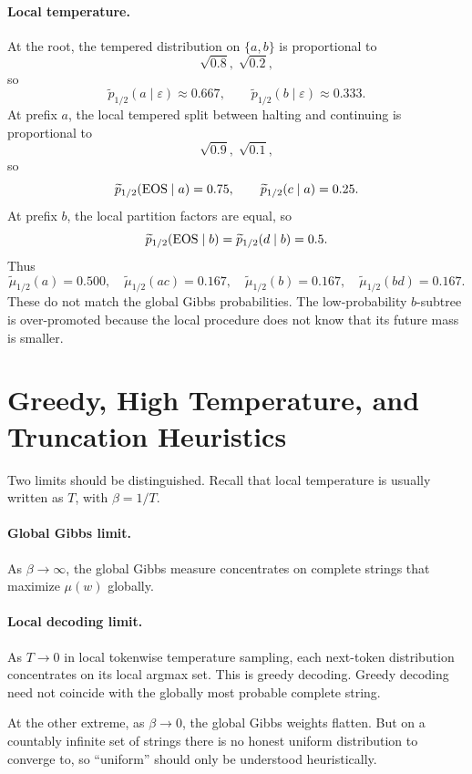 \paragraph{Local temperature.}
At the root, the tempered distribution on $\{a,b\}$ is proportional to
\[
  \sqrt{0.8},\; \sqrt{0.2},
\]
so
\[
  \widetilde p_{1/2}(a \mid \varepsilon) \approx 0.667,
  \qquad
  \widetilde p_{1/2}(b \mid \varepsilon) \approx 0.333.
\]
At prefix $a$, the local tempered split between halting and continuing is proportional to
\[
  \sqrt{0.9},\; \sqrt{0.1},
\]
so
\[
  \widetilde p_{1/2}(\operatorname{EOS} \mid a) = 0.75,
  \qquad
  \widetilde p_{1/2}(c \mid a)=0.25.
\]
At prefix $b$, the local partition factors are equal, so
\[
  \widetilde p_{1/2}(\operatorname{EOS} \mid b)=\widetilde p_{1/2}(d \mid b)=0.5.
\]
Thus
\[
  \widetilde\mu_{1/2}(a)=0.500,
  \quad
  \widetilde\mu_{1/2}(ac)=0.167,
  \quad
  \widetilde\mu_{1/2}(b)=0.167,
  \quad
  \widetilde\mu_{1/2}(bd)=0.167.
\]
These do not match the global Gibbs probabilities. The low-probability $b$-subtree is over-promoted because the local procedure does not know that its future mass is smaller.

\section{Greedy, High Temperature, and Truncation Heuristics}

Two limits should be distinguished.
Recall that local temperature is usually written as $T$, with $\beta = 1/T$.

\paragraph{Global Gibbs limit.}
As $\beta \to \infty$, the global Gibbs measure concentrates on complete strings that maximize $\mu(w)$ globally.

\paragraph{Local decoding limit.}
As $T \to 0$ in local tokenwise temperature sampling, each next-token distribution concentrates on its local argmax set. This is greedy decoding. Greedy decoding need not coincide with the globally most probable complete string.

At the other extreme, as $\beta \to 0$, the global Gibbs weights flatten. But on a countably infinite set of strings there is no honest uniform distribution to converge to, so ``uniform'' should only be understood heuristically.

